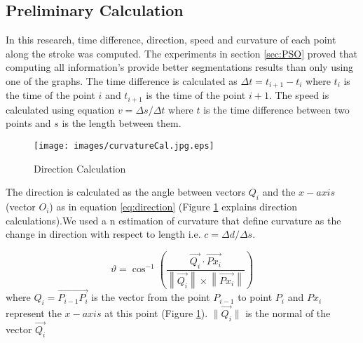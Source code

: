 \subsection{Preliminary Calculation}
\label{sec:CurvatureCalculation}
  
 
 In this research, time difference, direction, speed and curvature of each point along the stroke was computed. The experiments in section \ref{sec:PSO} proved that computing all information's provide better segmentations results than only using one of the graphs. The time difference is calculated as $\Delta t = t_{i+1} - t_i$ where $t_i$ is the time of the point $i$ and $t_{i+1}$ is the time of the point $i+1$. The speed is calculated using equation $v=\Delta s/\Delta t$ where $t$ is the time difference between two points and $s$ is the length between them. 
 
\begin{figure}
	\centering
		\texttt{[image: images/curvatureCal.jpg.eps]}
	\caption{Direction Calculation}
	\label{fig:curvatureCal.jpg}
\end{figure}

  The direction is calculated as the angle between vectors $Q_i$ and the $x-axis$ (vector $O_i$) as in equation \ref{eq:direction} (Figure \ref{fig:curvatureCal.jpg} explains direction calculations).We used a n estimation of curvature that define curvature as the change in direction with respect to length i.e. $c= \Delta d/\Delta s$.
  
 \begin{equation}
\label{eq:direction}
	\vartheta  = \cos ^{ - 1} \left( {\frac{{\overrightarrow {Q_i}  \cdot \overrightarrow {Px_i } }}{{\left\| {\overrightarrow {Q_i} } \right\| \times \left\| {\overrightarrow {Px_i} } \right\|}}} \right)
\end{equation}
where $Q_i=\overrightarrow {P_{i - 1} P_i }$ is the vector from the point  $P_{i - 1}$ to point $P_i$ and $Px_i$ represent the $x-axis$ at this point (Figure \ref{fig:curvatureCal.jpg}).  $\|{\overrightarrow {Q_i }}\|$ is the normal of the  vector $\overrightarrow{Q_i}$
 
 
 
